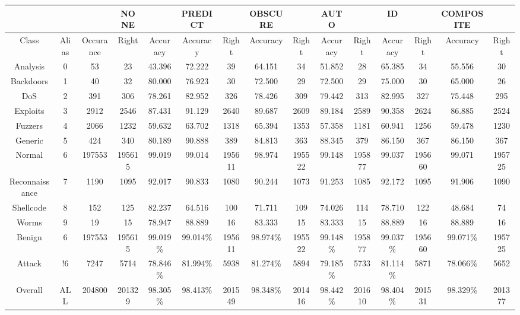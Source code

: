 \begin{table}[htb]
    \centering
    \begin{tabular}{@{}ccccccccccccccc@{}}
        \toprule
         &  &  & NONE &  & PREDICT &  & OBSCURE &  & AUTO &  & ID &  & COMPOSITE &  \\
        \midrule
        Class &  Alias &  Occurance &  Right &  Accuracy &  Accuracy &  Right &  Accuracy &  Right &  Accuracy &  Right &  Accuracy &  Right &  Accuracy &  Right \\
        Analysis &  0 &  53 &  23 &  43.396 &  72.222 &  39 &  64.151 &  34 &  51.852 &  28 &  65.385 &  34 &  55.556 &  30 \\
        Backdoors &  1 &  40 &  32 &  80.000 &  76.923 &  30 &  72.500 &  29 &  72.500 &  29 &  75.000 &  30 &  65.000 &  26 \\
        DoS &  2 &  391 &  306 &  78.261 &  82.952 &  326 &  78.426 &  309 &  79.442 &  313 &  82.995 &  327 &  75.448 &  295 \\
        Exploits &  3 &  2912 &  2546 &  87.431 &  91.129 &  2640 &  89.687 &  2609 &  89.184 &  2589 &  90.358 &  2624 &  86.885 &  2524 \\
        Fuzzers &  4 &  2066 &  1232 &  59.632 &  63.702 &  1318 &  65.394 &  1353 &  57.358 &  1181 &  60.941 &  1256 &  59.478 &  1230 \\
        Generic &  5 &  424 &  340 &  80.189 &  90.888 &  389 &  84.813 &  363 &  88.345 &  379 &  86.150 &  367 &  86.150 &  367 \\
        Normal &  6 &  197553 &  195615 &  99.019 &  99.014 &  195611 &  98.974 &  195522 &  99.148 &  195877 &  99.037 &  195660 &  99.071 &  195725 \\
        Reconnaissance &  7 &  1190 &  1095 &  92.017 &  90.833 &  1080 &  90.244 &  1073 &  91.253 &  1085 &  92.172 &  1095 &  91.906 &  1090 \\
        Shellcode &  8 &  152 &  125 &  82.237 &  64.516 &  100 &  71.711 &  109 &  74.026 &  114 &  78.710 &  122 &  48.684 &  74 \\
        Worms &  9 &  19 &  15 &  78.947 &  88.889 &  16 &  83.333 &  15 &  83.333 &  15 &  88.889 &  16 &  88.889 &  16 \\
        Benign &  6 &  197553 &  195615 &  99.019\% &  99.014\% &  195611 &  98.974\% &  195522 &  99.148\% &  195877 &  99.037\% &  195660 &  99.071\% &  195725 \\
        Attack &  !6 &  7247 &  5714 &  78.846\% &  81.994\% &  5938 &  81.274\% &  5894 &  79.185\% &  5733 &  81.114\% &  5871 &  78.066\% &  5652 \\
        Overall &  ALL &  204800 &  201329 &  98.305\% &  98.413\% &  201549 &  98.348\% &  201416 &  98.442\% &  201610 &  98.404\% &  201531 &  98.329\% &  201377 \\
        \bottomrule
    \end{tabular}
\end{table}
